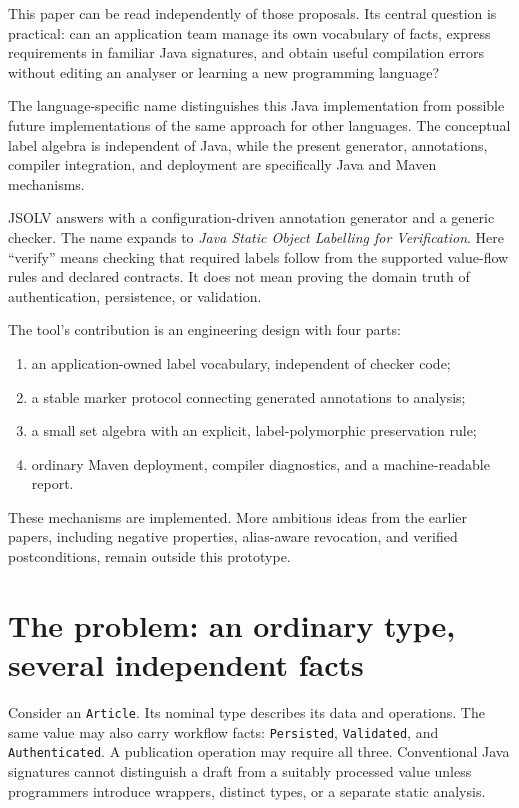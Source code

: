 \documentclass[11pt]{article}
\newcommand{\jsolv}{\textsc{JSOLV}}
\begin{document}
This paper can be read independently of those proposals. Its central question is
practical: can an application team manage its own vocabulary of facts, express
requirements in familiar Java signatures, and obtain useful compilation errors
without editing an analyser or learning a new programming language?

The language-specific name distinguishes this Java implementation from possible
future implementations of the same approach for other languages. The conceptual
label algebra is independent of Java, while the present generator, annotations,
compiler integration, and deployment are specifically Java and Maven mechanisms.

\jsolv{} answers with a configuration-driven annotation generator and a generic
checker. The name expands to \emph{Java Static Object Labelling for Verification}. Here
``verify'' means checking that required labels follow from the supported
value-flow rules and declared contracts. It does not mean proving the domain
truth of authentication, persistence, or validation.

The tool's contribution is an engineering design with four parts:
\begin{enumerate}[nosep]
  \item an application-owned label vocabulary, independent of checker code;
  \item a stable marker protocol connecting generated annotations to analysis;
  \item a small set algebra with an explicit, label-polymorphic preservation rule;
  \item ordinary Maven deployment, compiler diagnostics, and a machine-readable report.
\end{enumerate}
These mechanisms are implemented. More ambitious ideas from the earlier papers,
including negative properties, alias-aware revocation, and verified postconditions,
remain outside this prototype.

\section{The problem: an ordinary type, several independent facts}

Consider an \texttt{Article}. Its nominal type describes its data and operations.
The same value may also carry workflow facts: \texttt{Persisted},
\texttt{Validated}, and \texttt{Authenticated}. A publication operation may
require all three. Conventional Java signatures cannot distinguish a draft from
a suitably processed value unless programmers introduce wrappers, distinct types,
or a separate static analysis.
\end{document}
